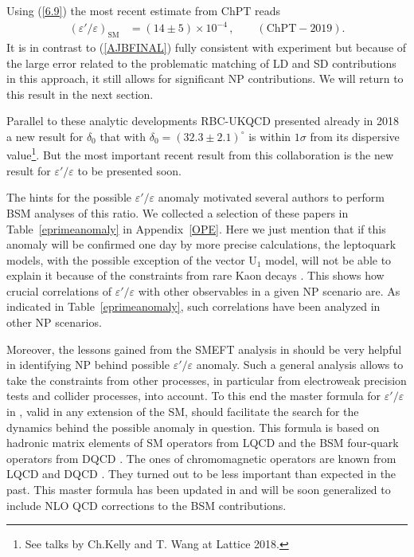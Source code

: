 \documentclass[12pt,a4paper]{article}
\def\epe{\varepsilon'/\varepsilon}
\begin{document}
  Using (\ref{6.9}) the most recent 
estimate from ChPT \cite{Cirigliano:2019ani,Gisbert:2020wkb} reads
  \begin{align}
  \label{Pich}
  (\epe)_\text{SM}  & = (14 \pm 5) \times 10^{-4} \,,\qquad (\text{ChPT}-2019).
\end{align}
  It is in contrast to (\ref{AJBFINAL}) fully consistent with experiment
  but because of the large error related to the problematic matching
  of LD and SD contributions in this approach, it still allows for significant
  NP contributions. We will return to this result in the next section.


Parallel to these analytic developments
RBC-UKQCD presented already in 2018 a new 
result for $\delta_0$ that 
with $\delta_0=(32.3\pm 2.1)^\circ$ is within $1\sigma$ from its dispersive
value\footnote{See talks by Ch.Kelly and T. Wang at Lattice 2018.}. 
But the most important recent result from this collaboration is the new
result for $\epe$ to be presented soon.



    The hints for the possible $\epe$ anomaly motivated several authors to perform BSM
  analyses of this ratio. We collected a selection of these papers in Table~\ref{eprimeanomaly} in Appendix~\ref{OPE}. Here we just mention that if this anomaly will be confirmed one day by more
  precise calculations, the leptoquark models, with the
  possible exception of the vector $\text{U}_1$ model, will not be able to
   explain it
 because of the constraints from rare Kaon decays
\cite{Bobeth:2017ecx}. This shows how crucial correlations of $\epe$ with other
observables in a given NP scenario are.  As indicated in Table~\ref{eprimeanomaly}, such correlations  have been analyzed in other NP scenarios.


Moreover, the lessons gained from the SMEFT analysis in \cite{Aebischer:2018csl}
should be very helpful in identifying NP behind possible  $\epe$ anomaly. Such
a general analysis allows to take the constraints from other
processes, in particular from electroweak precision tests and collider
processes,
into account. To this end the master formula for $\epe$ in \cite{Aebischer:2018quc},
valid in any extension of the SM, should facilitate the search for the dynamics
behind the possible anomaly in question. This formula is based on hadronic matrix elements of SM operators from LQCD and the BSM four-quark operators from DQCD
\cite{Aebischer:2018rrz}. The ones of chromomagnetic operators are known
from LQCD \cite{Constantinou:2017sgv} and DQCD \cite{Buras:2018evv}.
They turned out to be less important than expected in the past. This master
formula has been updated in \cite{Aebischer:2020jto} and will be soon generalized to include NLO QCD corrections to the BSM contributions.
\end{document}

